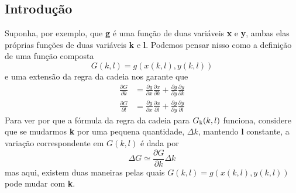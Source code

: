 \documentclass[a4paper]{article}
\begin{document}
\subsection*{Introdução}
\par Suponha, por exemplo, que \textbf{g} é uma função de duas variáveis \textbf{x} e \textbf{y}, ambas elas próprias funções de duas variáveis \textbf{k} e \textbf{l}.
Podemos pensar nisso como a definição de uma função composta
\begin{equation}
    G(k,l) = g(x(k,l),y(k,l))
\end{equation}
e uma extensão da regra da cadeia nos garante que
\begin{equation}
    \begin{split}
        \frac{\partial G}{\partial k} & = \frac{\partial g}{\partial x} \frac{\partial x}{\partial k} + \frac{\partial g}{\partial y} \frac{\partial y}{\partial k}  \\
        \frac{\partial G}{\partial l} & = \frac{\partial g}{\partial x} \frac{\partial x}{\partial l} + \frac{\partial g}{\partial y} \frac{\partial y}{\partial l}
    \end{split}
    \end{equation}
Para ver por que a fórmula da regra da cadeia para $G\textsubscript{k}(k,l)$ funciona, considere que se mudarmos \textbf{k} por uma pequena quantidade, \textbf{$\Delta k$}, mantendo \textbf{l} constante, a variação correspondente em $G(k,l)$ é dada por
\begin{equation}
    \Delta G \simeq \frac{\partial G}{\partial k} \Delta k
\end{equation}
mas aqui, existem duas maneiras pelas quais $G(k,l) = g(x(k,l),y(k,l))$ pode mudar com \textbf{k}.
\end{document}
